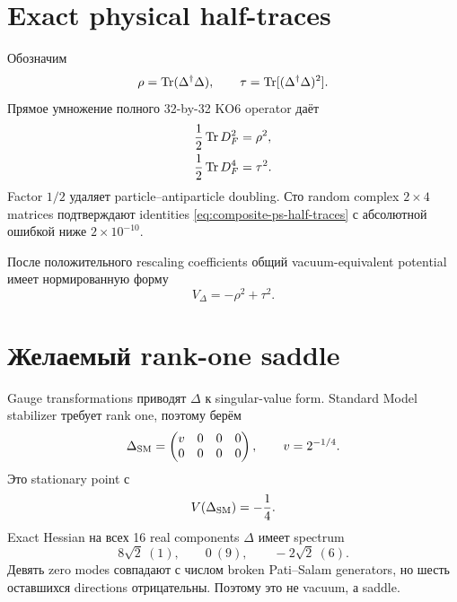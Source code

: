 \section{Exact physical half-traces}

Обозначим
\begin{equation}
 \rho=\operatorname{Tr}(\Delta^\dagger\Delta),
 \qquad
 \tau=\operatorname{Tr}[(\Delta^\dagger\Delta)^2].
\end{equation}
Прямое умножение полного 32-by-32 KO6 operator даёт
\begin{align}
 \frac12\operatorname{Tr} D_F^2&=\rho^2,\\
 \frac12\operatorname{Tr} D_F^4&=\tau^2.
 \label{eq:composite-ps-half-traces}
\end{align}
Factor \(1/2\) удаляет particle--antiparticle doubling. Сто random complex
\(2\times4\) matrices подтверждают identities
\eqref{eq:composite-ps-half-traces} с абсолютной ошибкой ниже
\(2\times10^{-10}\).

После положительного rescaling coefficients общий vacuum-equivalent
potential имеет нормированную форму
\begin{equation}
 \boxed{V_\Delta=-\rho^2+\tau^2.}
 \label{eq:composite-ps-potential}
\end{equation}

\section{Желаемый rank-one saddle}

Gauge transformations приводят \(\Delta\) к singular-value form. Standard
Model stabilizer требует rank one, поэтому берём
\begin{equation}
 \Delta_{\rm SM}
 =\begin{pmatrix}v&0&0&0\\0&0&0&0\end{pmatrix},
 \qquad
 v=2^{-1/4}.
\end{equation}
Это stationary point с
\begin{equation}
 V(\Delta_{\rm SM})=-\frac14.
\end{equation}
Exact Hessian на всех 16 real components \(\Delta\) имеет spectrum
\begin{equation}
 \boxed{
 8\sqrt2\ (1),\qquad
 0\ (9),\qquad
 -2\sqrt2\ (6).}
 \label{eq:composite-ps-rank-one-hessian}
\end{equation}
Девять zero modes совпадают с числом broken Pati--Salam generators, но шесть
оставшихся directions отрицательны. Поэтому это не vacuum, а saddle.

